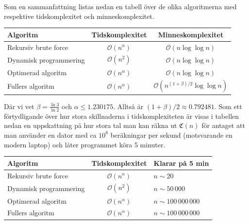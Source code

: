 \documentclass[a4paper,titlepage]{article}
\newcommand{\C}[1]{\mathfrak C \left( #1 \right)}
\renewcommand{\O}{\mathcal {O}}
\theoremstyle{definition}
\begin{document}
        Som en sammanfattning listas nedan en tabell över de olika algoritmerna 
        med respektive tidskomplexitet och minneskomplexitet.


        \begin{table}[H]
        \begin{tabular}[pos]{|l | c | c |}
            \hline
            \textbf{Algoritm}       & \textbf{Tidskomplexitet} &  \textbf{Minneskomplexitet}\\ \hline
            Rekursiv brute force    & $\O(n^n)$      & $\O(n\log\log n)$ \\ \hline
            Dynamisk programmering  & $\O(n^2)$      & $\O(n\log\log n)$ \\ \hline
            Optimerad algoritm      & $\O(n^\alpha)$ & $\O(n\log\log n)$ \\ \hline
            Fullers algoritm       & $\O(n^\alpha)$ & $\O(n^{(1+\beta)/2}\log\log n)$\\ \hline
        \end{tabular}
        \end{table}
    
        \noindent
        Där vi vet $\beta=\frac{\ln 3}{\ln 2}$ och $\alpha \le 1.230175$. Alltså är
        $(1+\beta)/2 \approx 0.792481$. Som ett förtydligande över hur stora
        skillnaderna i tidskomplexiteten är visas i tabellen nedan en
        uppskattning på hur stora tal man kan räkna ut $\C{n}$ för antaget att
        man använder en dator med ca $10^8$ beräkningar per sekund (motsvarande
        en modern laptop) och låter programmet köra 5 minuter.

        \begin{table}[H]
        \begin{tabular}[pos]{|l | c | l |}
            \hline
            \textbf{Algoritm}       & \textbf{Tidskomplexitet} &  \textbf{Klarar på 5 min}\\ \hline
            Rekursiv brute force    & $\O(n^n)$      & $n\sim20$ \\ \hline
            Dynamisk programmering  & $\O(n^2)$      & $n\sim50\,000$ \\ \hline
            Optimerad algoritm      & $\O(n^\alpha)$ & $n\sim100\,000\,000$ \\ \hline
            Fullers algoritm       & $\O(n^\alpha)$ & $n\sim100\,000\,000$ \\ \hline
        \end{tabular}
        \end{table}
        
\end{document}
